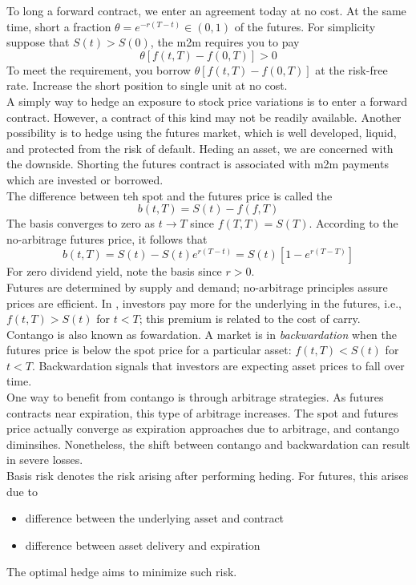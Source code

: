 \documentclass{article}
\begin{document}
To long a forward contract, we enter an agreement today at no cost. At the same time, short a fraction $\theta = e^{-r(T-t)} \in (0,1)$ of the futures. For simplicity suppose that $S(t) > S(0)$, the m2m requires you to pay $$\theta [f(t,T) - f(0,T)] > 0$$ To meet the requirement, you borrow $\theta [f(t,T) - f(0,T)]$ at the risk-free rate. Increase the short position to single unit at no cost. \\ 

A simply way to hedge an exposure to stock price variations is to enter a forward contract. However, a contract of this kind may not be readily available. Another possibility is to hedge using the futures market, which is well developed, liquid, and protected from the risk of default. Heding an asset, we are concerned with the downside. Shorting the futures contract is associated with m2m payments which are invested or borrowed. \\ 

The difference between teh spot and the futures price is called the  $$b(t,T) = S(t) - f(f,T)$$ The basis converges to zero as $t \rightarrow T$ since $f(T,T) = S(T)$. According to the no-arbitrage futures price, it follows that $$b(t,T) = S(t) - S(t)e^{r(T-t)} = S(t)[1- e^{r(T-T)}]$$ For zero dividend yield, note the basis since $r>0$. \\ 

Futures are determined by supply and demand; no-arbitrage principles assure prices are efficient. In , investors pay more for the underlying in the futures, i.e., $f(t,T) > S(t)$ for $t<T$; this premium is related to the cost of carry. Contango is also known as fowardation. A market is in \emph{backwardation} when the futures price is below the spot price for a particular asset: $f(t,T) < S(t)$ for $t < T$. Backwardation signals that investors are expecting asset prices to fall over time. \\ 

One way to benefit from contango is through arbitrage strategies. As futures contracts near expiration, this type of arbitrage increases. The spot and futures price actually converge as expiration approaches due to arbitrage, and contango diminsihes. Nonetheless, the shift between contango and backwardation can result in severe losses. \\ 

Basis risk denotes the risk arising after performing heding. For futures, this arises due to 
\begin{itemize}
  \item difference between the underlying asset and contract 
  \item difference between asset delivery and expiration
\end{itemize}
The optimal hedge aims to minimize such risk. 
\end{document}
